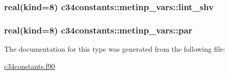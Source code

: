 \subsubsection[{lint\+\_\+shv}]{\setlength{\rightskip}{0pt plus 5cm}real(kind=8) c34constants\+::metinp\+\_\+vars\+::lint\+\_\+shv}\label{structc34constants_1_1metinp__vars_a8cf66324715d983f7b618d876099090c}
\hypertarget{structc34constants_1_1metinp__vars_a5d75984acca70974ff8c6bd53628f1d0}{}
\subsubsection[{par}]{\setlength{\rightskip}{0pt plus 5cm}real(kind=8) c34constants\+::metinp\+\_\+vars\+::par}\label{structc34constants_1_1metinp__vars_a5d75984acca70974ff8c6bd53628f1d0}


The documentation for this type was generated from the following file\+:\begin{DoxyCompactItemize}
\item 
\hyperlink{c34constants_8f90}{c34constants.\+f90}\end{DoxyCompactItemize}
